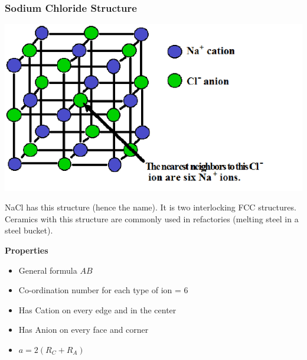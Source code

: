 \documentclass[12pt]{article}
\begin{document}
\subsubsection{Sodium Chloride Structure}
\begin{center}
  \includegraphics[scale=0.5]{naclstructure}
\end{center}

NaCl has this structure (hence the name).
It is two interlocking FCC structures. 
Ceramics with this structure are commonly used in refactories (melting steel in a steel bucket).

\textbf{Properties}
\begin{itemize}
  \item General formula $AB$
  \item Co-ordination number for each type of ion = 6
  \item Has Cation on every edge and in the center
  \item Has Anion on every face and corner 
  \item $a = 2(R_C + R_A)$
\end{itemize}
\end{document}
